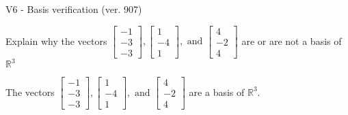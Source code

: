 \begin{exercise}
  \begin{exerciseTitle}V6 - Basis verification (ver. 907)\end{exerciseTitle}
  \begin{exerciseStatement}
    Explain why the vectors \(\left[\begin{array}{r}
-1 \\
-3 \\
-3
\end{array}\right] , \left[\begin{array}{r}
1 \\
-4 \\
1
\end{array}\right] , \text{ and } \left[\begin{array}{r}
4 \\
-2 \\
4
\end{array}\right]\) are or are not a basis of \(\mathbb{R}^3\)	


  \end{exerciseStatement}
  \begin{exerciseAnswer}
   The vectors \(\left[\begin{array}{r}
-1 \\
-3 \\
-3
\end{array}\right] , \left[\begin{array}{r}
1 \\
-4 \\
1
\end{array}\right] , \text{ and } \left[\begin{array}{r}
4 \\
-2 \\
4
\end{array}\right]\) 
  	 are  a basis of \(\mathbb{R}^3\).
  


  \end{exerciseAnswer}
\end{exercise}